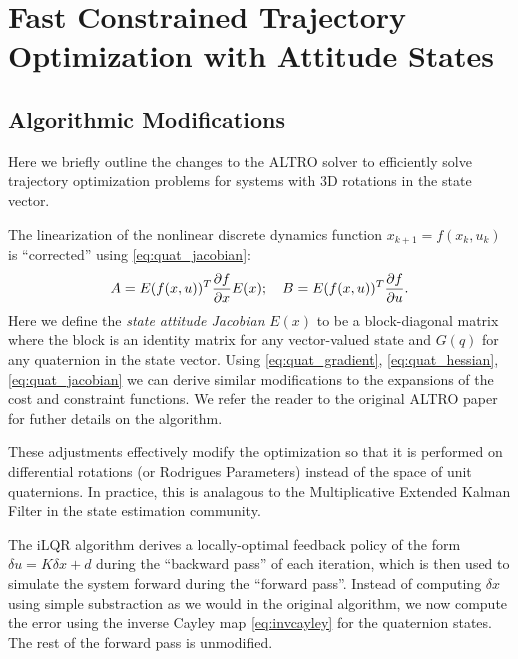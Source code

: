 \documentclass[letterpaper, 10 pt, conference]{ieeeconf}  %
\begin{document}
\section{Fast Constrained Trajectory Optimization with Attitude States}
    \subsection{Algorithmic Modifications}
    Here we briefly outline the changes to the ALTRO solver \cite{howell2019altro} to 
    efficiently solve trajectory optimization problems for systems with 3D rotations in the
    state vector. 

    The linearization of the nonlinear discrete dynamics function $x_{k+1} = f(x_k,u_k)$
    is ``corrected'' using \ref{eq:quat_jacobian}: \begin{equation} A = E(f(x,u))^T
    \pdv{f}{x} E(x); \quad B = E(f(x,u))^T \pdv{f}{u}. \end{equation} Here we define the
    \textit{state attitude Jacobian} $E(x)$ to be a block-diagonal matrix where the block
    is an identity matrix for any vector-valued state and $G(q)$ for any quaternion in
    the state vector. Using \eqref{eq:quat_gradient}, \eqref{eq:quat_hessian},
    \eqref{eq:quat_jacobian} we can derive similar modifications to the expansions of the
    cost and constraint functions. We refer the reader to the original ALTRO paper
    \cite{howell2019altro} for futher details on the algorithm.

    These adjustments effectively modify the optimization so that it is performed on 
    differential rotations (or Rodrigues Parameters) instead of the space of unit
    quaternions. In practice, this is analagous to the Multiplicative Extended Kalman
    Filter \cite{markley2014fundamentals} in the state estimation community.

    The iLQR algorithm derives a locally-optimal feedback policy of the form $\delta u =
    K \delta x + d$ during the ``backward pass'' of each iteration, which is then used to
    simulate the system forward during the ``forward pass''. Instead of computing $\delta
    x$ using simple substraction as we would in the original algorithm, we now compute the
    error using the inverse Cayley map \eqref{eq:invcayley} for the quaternion states. The
    rest of the forward pass is unmodified.
\end{document}
